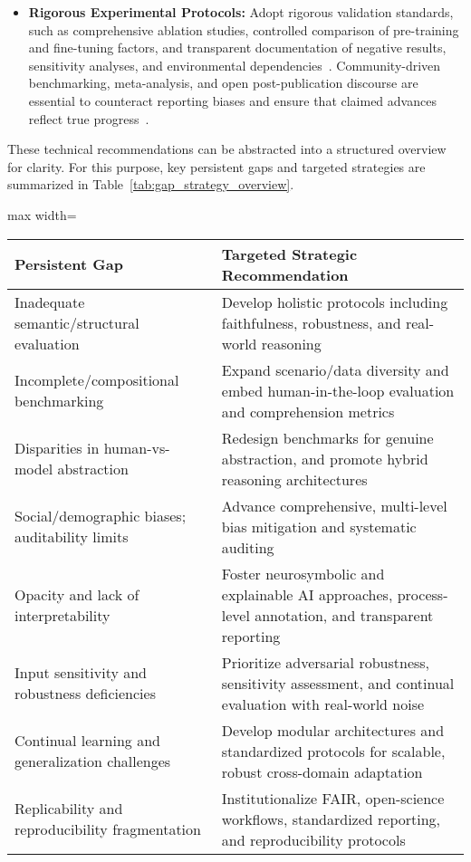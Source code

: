 \documentclass[sigconf]{acmart}
\begin{document}
\begin{itemize}
    \item \textbf{Rigorous Experimental Protocols:} Adopt rigorous validation standards, such as comprehensive ablation studies, controlled comparison of pre-training and fine-tuning factors, and transparent documentation of negative results, sensitivity analyses, and environmental dependencies~\cite{ref9,ref10,ref55,ref59,ref61,ref62,ref66,ref74,ref90,ref104,ref105,ref106,ref107,ref108}. Community-driven benchmarking, meta-analysis, and open post-publication discourse are essential to counteract reporting biases and ensure that claimed advances reflect true progress~\cite{ref22,ref45,ref55,ref61,ref88,ref101,ref106,ref107,ref108}.
\end{itemize}

These technical recommendations can be abstracted into a structured overview for clarity. For this purpose, key persistent gaps and targeted strategies are summarized in Table~\ref{tab:gap_strategy_overview}.

\begin{table*}[htbp]
\centering
\caption{Mapping of Persistent Gaps to Targeted Strategic Recommendations}
\label{tab:gap_strategy_overview}
\begin{adjustbox}{max width=\textwidth}
\begin{tabular}{ll}
\toprule
\textbf{Persistent Gap} & \textbf{Targeted Strategic Recommendation} \\
\midrule
Inadequate semantic/structural evaluation & Develop holistic protocols including faithfulness, robustness, and real-world reasoning \\
Incomplete/compositional benchmarking & Expand scenario/data diversity and embed human-in-the-loop evaluation and comprehension metrics \\
Disparities in human-vs-model abstraction & Redesign benchmarks for genuine abstraction, and promote hybrid reasoning architectures \\
Social/demographic biases; auditability limits & Advance comprehensive, multi-level bias mitigation and systematic auditing \\
Opacity and lack of interpretability & Foster neurosymbolic and explainable AI approaches, process-level annotation, and transparent reporting \\
Input sensitivity and robustness deficiencies & Prioritize adversarial robustness, sensitivity assessment, and continual evaluation with real-world noise \\
Continual learning and generalization challenges & Develop modular architectures and standardized protocols for scalable, robust cross-domain adaptation \\
Replicability and reproducibility fragmentation & Institutionalize FAIR, open-science workflows, standardized reporting, and reproducibility protocols \\
\bottomrule
\end{tabular}
\end{adjustbox}
\end{table*}
\end{document}

